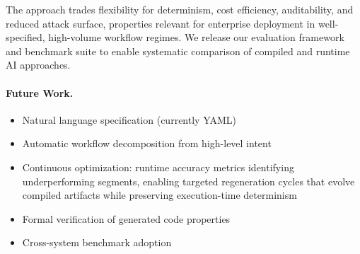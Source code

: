 \documentclass[11pt]{article}
\begin{document}
The approach trades flexibility for determinism, cost efficiency, auditability, and reduced attack surface, properties relevant for enterprise deployment in well-specified, high-volume workflow regimes. We release our evaluation framework and benchmark suite to enable systematic comparison of compiled and runtime AI approaches.

\paragraph{Future Work.}
\begin{itemize}
    \item Natural language specification (currently YAML)
    \item Automatic workflow decomposition from high-level intent
    \item Continuous optimization: runtime accuracy metrics identifying underperforming segments, enabling targeted regeneration cycles that evolve compiled artifacts while preserving execution-time determinism
    \item Formal verification of generated code properties
    \item Cross-system benchmark adoption
\end{itemize}



\end{document}
